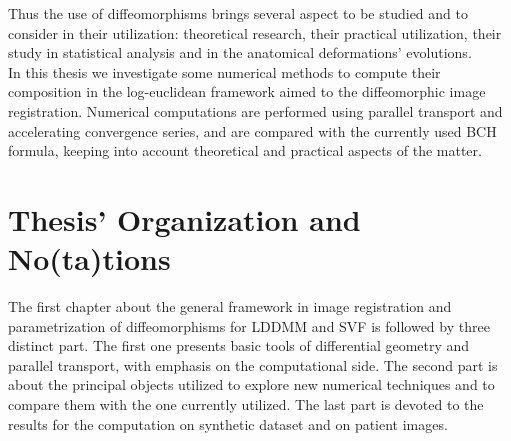 Thus the use of diffeomorphisms brings several aspect to be studied and to consider in their utilization:
theoretical research, their practical utilization, their study in statistical analysis and in the anatomical deformations' evolutions.\\
In this thesis we investigate some numerical methods to compute their composition in the log-euclidean framework aimed to the diffeomorphic image registration. Numerical computations are performed using parallel transport and accelerating convergence series, and are compared with the currently used BCH formula, keeping into account theoretical and practical aspects of the matter.

\section*{Thesis' Organization and No(ta)tions}

The first chapter about the general framework in image registration and parametrization of diffeomorphisms for LDDMM and SVF is followed by three distinct part. The first one presents basic tools of differential geometry and parallel transport, with emphasis on the computational side. The second part is about the principal objects utilized to explore new numerical techniques and to compare them with the one currently utilized. The last part is devoted to the results for the computation on synthetic dataset and on patient images. \\

